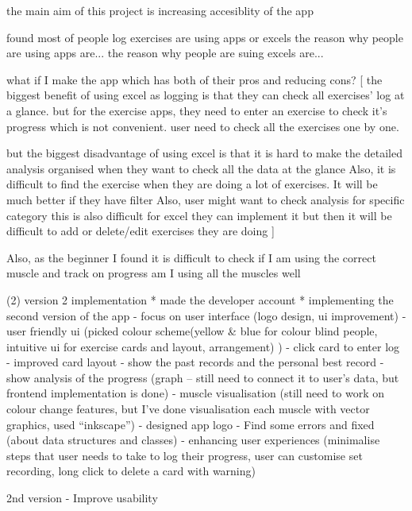 the main aim of this project is increasing accesiblity of the app

found most of people log exercises are using apps or excels
the reason why people are using apps are...
the reason why people are suing excels are...

what if I make the app which has both of their pros and reducing cons?
[
    the biggest benefit of using excel as logging is that they can check all exercises' log at a glance.
    but for the exercise apps, they need to enter an exercise to check it's progress which is not convenient.
    user need to check all the exercises one by one.
    
    but the biggest disadvantage of using excel is that it is hard to make the detailed analysis organised when they want to check all the data at the glance
    Also, it is difficult to find the exercise when they are doing a lot of exercises. 
    It will be much better if they have filter
    Also, user might want to check analysis for specific category
    this is also difficult for excel
    they can implement it but then it will be difficult to add or delete/edit exercises they are doing
]

Also, as the beginner I found it is difficult to check if I am using the correct muscle and track on progress
am I using all the muscles well


(2) version 2 implementation
* made the developer account
* implementing the second version of the app
    - focus on user interface (logo design, ui improvement)
    -user friendly ui (picked colour scheme(yellow & blue for colour blind people, intuitive ui for exercise cards and layout, arrangement) )
    - click card to enter log
    - improved card layout
    - show the past records and the personal best record
    - show analysis of the progress (graph – still need to connect it to user’s data, but frontend implementation is done)
    - muscle visualisation (still need to work on colour change features, but I’ve done visualisation each muscle with vector graphics, used “inkscape”)
    - designed app logo
    - Find some errors and fixed (about data structures and classes)
    - enhancing user experiences
(minimalise steps that user needs to take to log their progress, user can customise set recording, long click to delete a card with warning)


2nd version - Improve usability


